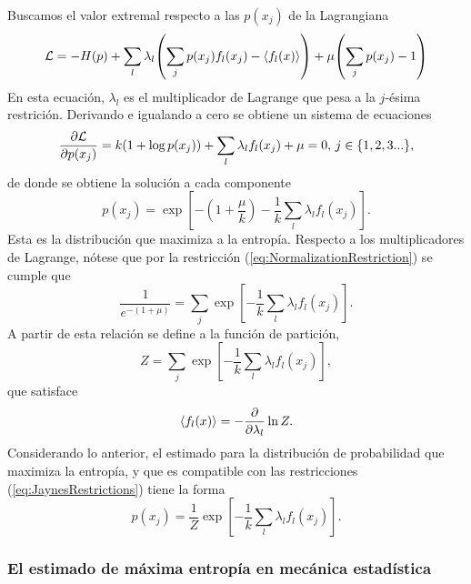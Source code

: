 Buscamos el valor extremal respecto a las $p(x_{j})$ de la Lagrangiana
\begin{equation}
    \mathcal{L}=-H(p)+\sum_{l}\lambda_{l}\qty(\sum_{j}p(x_{j})f_{l}(x_{j})-\expval{f_{l}(x)})+\mu\qty(\sum_{j}p(x_{j})-1)\nonumber
\end{equation}
En esta ecuación, $\lambda_{l}$ es el multiplicador de Lagrange que pesa a la $j$-ésima restrición. Derivando e igualando a cero se obtiene un sistema de ecuaciones
\begin{equation}
    \frac{\partial \mathcal{L}}{\partial p(x_{j})}=k(1+\log{p(x_{j})})+\sum_{l}\lambda_{l}f_{l}(x_{j})+\mu=0,\, j\in\{1,2,3...\},\nonumber
\end{equation}
de donde se obtiene la solución a cada componente
\begin{equation}
    p(x_{j})=\exp[-(1+\frac{\mu}{k})-\frac{1}{k}\sum_{l}\lambda_{l}f_{l}(x_{j})].\nonumber
\end{equation}
Esta es la distribución que maximiza a la entropía. Respecto a los multiplicadores de Lagrange, nótese que por la restricción (\ref{eq:NormalizationRestriction}) se cumple que
\begin{equation}
    \frac{1}{e^{-(1+\mu)}}=\sum_{j}\exp[-\frac{1}{k}\sum_{l}\lambda_{l}f_{l}(x_{j})].\nonumber
\end{equation}
A partir de esta relación se define a la función de partición,
\begin{equation}
    Z=\sum_{j}\exp[-\frac{1}{k}\sum_{l}\lambda_{l}f_{l}(x_{j})],\nonumber
\end{equation}
que satisface
\begin{equation}
    \expval{f_{l}(x)}=-\frac{\partial}{\partial \lambda_{l}}\ln{Z}.\nonumber
\end{equation}
Considerando lo anterior, el estimado para la distribución de probabilidad que maximiza la entropía, y que es compatible con las restricciones (\ref{eq:JaynesRestrictions}) tiene la forma 
\begin{equation}\label{eq:MaxEntDist}
    p(x_{j})=\frac{1}{Z}\exp[-\frac{1}{k}\sum_{l}\lambda_{l}f_{l}(x_{j})].
\end{equation}

\subsubsection{El estimado de máxima entropía en mecánica estadística}

